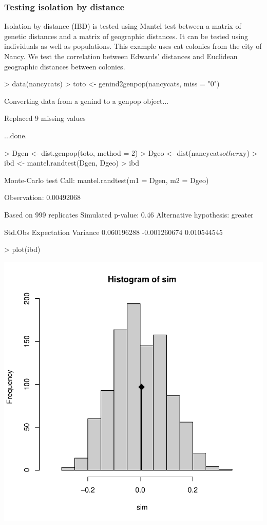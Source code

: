 \documentclass{article}
\begin{document}
\subsubsection{Testing isolation by distance}
Isolation by distance (IBD) is tested using Mantel test between a matrix of genetic distances and a matrix of geographic distances.
It can be tested using individuals as well as populations.
This example uses cat colonies from the city of Nancy.
We test the correlation between Edwards' distances and Euclidean geographic distances between colonies.
\begin{Schunk}
\begin{Sinput}
> data(nancycats)
> toto <- genind2genpop(nancycats, miss = "0")
\end{Sinput}
\begin{Soutput}
 Converting data from a genind to a genpop object... 

 Replaced 9 missing values 

...done.
\end{Soutput}
\begin{Sinput}
> Dgen <- dist.genpop(toto, method = 2)
> Dgeo <- dist(nancycats$other$xy)
> ibd <- mantel.randtest(Dgen, Dgeo)
> ibd
\end{Sinput}
\begin{Soutput}
Monte-Carlo test
Call: mantel.randtest(m1 = Dgen, m2 = Dgeo)

Observation: 0.00492068 

Based on 999 replicates
Simulated p-value: 0.46 
Alternative hypothesis: greater 

     Std.Obs  Expectation     Variance 
 0.060196288 -0.001260674  0.010544545 
\end{Soutput}
\end{Schunk}
\begin{Schunk}
\begin{Sinput}
> plot(ibd)
\end{Sinput}
\end{Schunk}
\includegraphics{figs/base-080}
\end{document}
